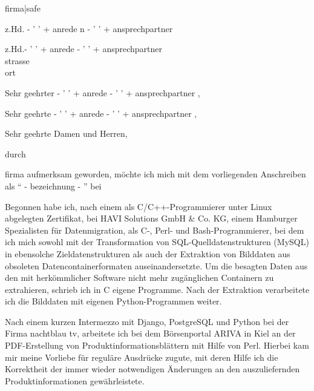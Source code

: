 \documentclass[a4paper,11pt]{dinbrief}
\begin{document}
\subject{ {{ bezeichnung }} }
\signature{Andreas Grell} 
\Datum{\todaysname, \today} 
\address{Andreas Grell \\
  Hispanist, Germanist, Softwareentwickler \\
  Kühnehöfe 25 \\
  D-22761 Hamburg} 
\begin{letter}
    { {{ firma|safe }} \\
    {%
      z.Hd. {{- ' ' + anrede }}n {{- ' ' + ansprechpartner }} \\
    {%
    {%
      z.Hd.{{- ' ' + anrede }} {{- ' ' + ansprechpartner }} \\
    {%
    {{ strasse }} \\ 
    {{ ort }} }
    {%
      \opening{ Sehr geehrter {{- ' ' + anrede }} {{- ' ' + ansprechpartner }},}
    {%
      \opening{ Sehr geehrte {{- ' ' + anrede }} {{- ' ' + ansprechpartner }},}
    {%
    \opening{ Sehr geehrte Damen und Herren, }            
      {%
                

      durch {%
      {{ firma }} aufmerksam geworden, möchte ich mich mit dem vorliegenden Anschreiben als \enquote{ {{- bezeichnung -}} }
      bei {%
      
      Begonnen habe ich, nach einem als C/C++-Programmierer unter Linux abgelegten Zertifikat, bei HAVI Solutions
      GmbH \& Co. KG, einem Hamburger Spezialisten für Datenmigration, als C-, Perl- und Bash-Programmierer, bei
      dem ich mich sowohl mit der Transformation von SQL-Quelldatenstrukturen (MySQL) in ebensolche Zieldatenstrukturen
      als auch der Extraktion von Bilddaten aus obsoleten Datencontainerformaten auseinandersetzte. Um die besagten
      Daten aus den mit herkömmlicher Software nicht mehr zugänglichen Containern zu extrahieren, schrieb ich in
      C eigene Programme. Nach der Extraktion verarbeitete ich die Bilddaten mit eigenen Python-Programmen weiter.

      Nach einem kurzen Intermezzo mit Django, PostgreSQL und Python bei der Firma nachtblau tv, arbeitete ich bei dem
      Börsenportal ARIVA in Kiel an der PDF-Erstellung von Produktinformationsblättern mit Hilfe von
      Perl. Hierbei kam mir meine Vorliebe für reguläre Ausdrücke zugute, mit deren Hilfe ich die Korrektheit
      der immer wieder notwendigen Änderungen an den auszuliefernden Produktinformationen gewährleistete.
      
}}}}}}}}}}
\end{letter}
\end{document}
